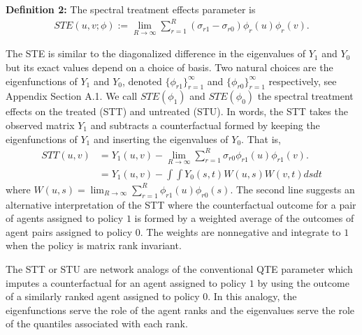 \documentclass[12pt]{article}
\theoremstyle{definition}
\begin{document}
\begin{flushleft}
\textbf{Definition 2:} The spectral treatment effects parameter is 
\begin{align}\label{ste}
STE(u,v;\phi) := \lim_{R \to \infty}\sum_{r=1}^{R}(\sigma_{r1}-\sigma_{r0})\phi_{r}(u)\phi_{r}(v).
\end{align}
\end{flushleft}
 The STE is similar to the diagonalized difference in the eigenvalues of $Y_{1}$ and $Y_{0}$ but its exact values depend on a choice of basis. Two natural choices are the eigenfunctions of $Y_{1}$ and $Y_{0}$, denoted $\{\phi_{r1}\}_{r=1}^{\infty}$ and $\{\phi_{r0}\}_{r=1}^{\infty}$ respectively, see Appendix Section A.1. We call $STE(\phi_{1}) $ and $STE(\phi_{0})$ the spectral treatment effects on the treated (STT) and untreated (STU). In words, the STT takes the observed matrix $Y_{1}$ and subtracts a counterfactual formed by keeping the eigenfunctions of $Y_{1}$ and inserting the eigenvalues of $Y_{0}$. That is, 
 \begin{align*}
STT(u,v) &=  Y_{1}(u,v) - \lim_{R \to \infty}\sum_{r=1}^{R}\sigma_{r0}\phi_{r1}(u)\phi_{r1}(v). 
 \\&= Y_{1}(u,v)  -  \int\int Y_{0}(s,t)W(u,s)W(v,t)dsdt
 \end{align*}
where $W(u,s) = \lim_{R \to \infty}\sum_{r=1}^{R}\phi_{r1}(u)\phi_{r0}(s)$. The second line suggests an alternative interpretation of the STT where the counterfactual outcome for a pair of agents assigned to policy $1$ is formed by a weighted average of the outcomes of agent pairs assigned to policy $0$. The weights are nonnegative and integrate to $1$ when the policy is matrix rank invariant.  

The STT or STU are network analogs of the conventional QTE parameter which imputes a counterfactual for an agent assigned to policy $1$ by using the outcome of a similarly ranked agent assigned to policy $0$. In this analogy, the eigenfunctions serve the role of the agent ranks and the eigenvalues serve the role of the quantiles associated with each rank.  
\end{document}
